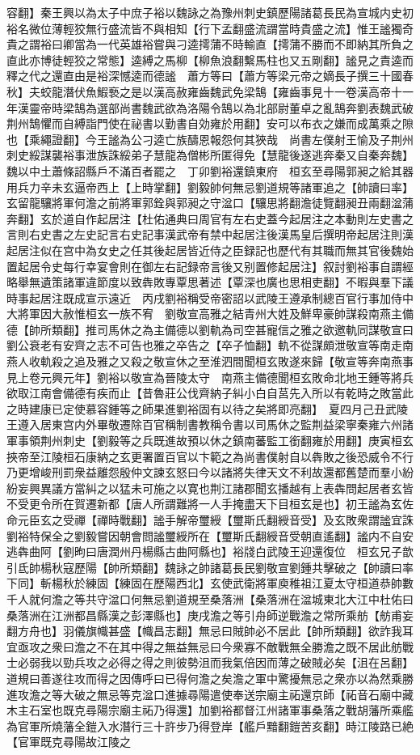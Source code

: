 容翻】秦王興以為太子中庶子裕以魏詠之為豫州刺史鎮歷陽諸葛長民為宣城内史初裕名微位薄輕狡無行盛流皆不與相知【行下孟翻盛流謂當時貴盛之流】惟王謐獨奇貴之謂裕曰卿當為一代英雄裕嘗與刁逵摴蒲不時輸直【摴蒲不勝而不即納其所負之直此亦博徒輕狡之常態】逵縛之馬柳【柳魚浪翻繫馬柱也又五剛翻】謐見之責逵而釋之代之還直由是裕深憾逵而德謐　蕭方等曰【蕭方等梁元帝之嫡長子撰三十國春秋】夫蛟龍潛伏魚鰕䙝之是以漢高赦雍齒魏武免梁鵠【雍齒事見十一卷漢高帝十一年漢靈帝時梁鵠為選部尚書魏武欲為洛陽令鵠以為北部尉董卓之亂鵠奔劉表魏武破荆州鵠懼而自縛詣門使在祕書以勤書自効雍於用翻】安可以布衣之嫌而成萬乘之隙也【乘繩證翻】今王謐為公刁逵亡族醻恩報怨何其狹哉　尚書左僕射王愉及子荆州刺史綏謀襲裕事泄族誅綏弟子慧龍為僧彬所匿得免【慧龍後遂逃奔秦又自秦奔魏】　魏以中土蕭條詔縣戶不滿百者罷之　丁卯劉裕還鎮東府　桓玄至尋陽郭昶之給其器用兵力辛未玄逼帝西上【上時掌翻】劉毅帥何無忌劉道規等諸軍追之【帥讀曰率】玄留龍驤將軍何澹之前將軍郭銓與郭昶之守湓口【驤思將翻澹徒覽翻昶丑兩翻湓蒲奔翻】玄於道自作起居注【杜佑通典曰周官有左右史蓋今起居注之本動則左史書之言則右史書之左史記言右史記事漢武帝有禁中起居注後漢馬皇后撰明帝起居注則漢起居注似在宫中為女史之任其後起居皆近侍之臣録記也歷代有其職而無其官後魏始置起居令史每行幸宴會則在御左右記録帝言後又别置修起居注】叙討劉裕事自謂經略舉無遺策諸軍違節度以致犇敗專覃思著述【覃深也廣也思相吏翻】不暇與羣下議時事起居注既成宣示遠近　丙戌劉裕稱受帝密詔以武陵王遵承制總百官行事加侍中大將軍因大赦惟桓玄一族不宥　劉敬宣高雅之結青州大姓及鮮卑豪帥謀殺南燕主備德【帥所類翻】推司馬休之為主備德以劉軌為司空甚寵信之雅之欲邀軌同謀敬宣曰劉公衰老有安齊之志不可告也雅之卒告之【卒子恤翻】軌不從謀頗泄敬宣等南走南燕人收軌殺之追及雅之又殺之敬宣休之至淮泗間聞桓玄敗遂來歸【敬宣等奔南燕事見上卷元興元年】劉裕以敬宣為晉陵太守　南燕主備德聞桓玄敗命北地王鍾等將兵欲取江南會備德有疾而止【昔魯莊公伐齊納子糾小白自莒先入所以有乾時之敗當此之時建康已定使慕容鍾等之師果進劉裕固有以待之矣將即亮翻】　夏四月己丑武陵王遵入居東宫内外畢敬遷除百官稱制書教稱令書以司馬休之監荆益梁寧秦雍六州諸軍事領荆州刺史【劉毅等之兵既進故預以休之鎮南蕃監工銜翻雍於用翻】庚寅桓玄挾帝至江陵桓石康納之玄更署置百官以卞範之為尚書僕射自以犇敗之後恐威令不行乃更增峻刑罰衆益離怨殷仲文諫玄怒曰今以諸將失律天文不利故還都舊楚而羣小紛紛妄興異議方當糾之以猛未可施之以寛也荆江諸郡聞玄播越有上表犇問起居者玄皆不受更令所在賀遷新都【唐人所謂難將一人手掩盡天下目桓玄是也】初王謐為玄佐命元臣玄之受禪【禪時戰翻】謐手解帝璽綬【璽斯氏翻綬音受】及玄敗衆謂謐宜誅劉裕特保全之劉毅嘗因朝會問謐璽綬所在【璽斯氏翻綬音受朝直遙翻】謐内不自安逃犇曲阿【劉昫曰唐潤州丹楊縣古曲阿縣也】裕牋白武陵王迎還復位　桓玄兄子歆引氐帥楊秋寇歷陽【帥所類翻】魏詠之帥諸葛長民劉敬宣劉鍾共擊破之【帥讀曰率下同】斬楊秋於練固【練固在歷陽西北】玄使武衛將軍庾稚祖江夏太守桓道恭帥數千人就何澹之等共守湓口何無忌劉道規至桑落洲【桑落洲在湓城東北大江中杜佑曰桑落洲在江洲都昌縣漢之彭澤縣也】庚戌澹之等引舟師逆戰澹之常所乘舫【舫甫妄翻方舟也】羽儀旗幟甚盛【幟昌志翻】無忌曰賊帥必不居此【帥所類翻】欲詐我耳宜亟攻之衆曰澹之不在其中得之無益無忌曰今衆寡不敵戰無全勝澹之既不居此舫戰士必弱我以勁兵攻之必得之得之則彼勢沮而我氣倍因而薄之破賊必矣【沮在呂翻】道規曰善遂往攻而得之因傳呼曰已得何澹之矣澹之軍中驚擾無忌之衆亦以為然乘勝進攻澹之等大破之無忌等克湓口進據尋陽遣使奉送宗廟主祏還京師【祏音石廟中藏木主石室也既克尋陽宗廟主祏乃得還】加劉裕都督江州諸軍事桑落之戰胡藩所乘艦為官軍所燒藩全鎧入水潛行三十許步乃得登岸【艦戶黯翻鎧苦亥翻】時江陵路已絶【官軍既克尋陽故江陵之